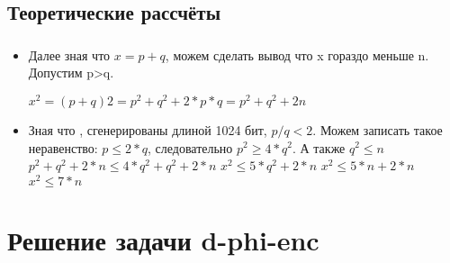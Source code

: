 \documentclass[t]{beamer}
\begin{document}
\subsection{Теоретические рассчёты}
\begin{frame}[t] %
	\frametitle{\insertsection}
	\framesubtitle{\insertsubsection}
        \begin{itemize}
            \item Далее зная что $x = p + q$, можем сделать вывод что x гораздо меньше n. Допустим p>q.
            \begin{center}
                \( x^2=(p+q)2=p^2+q^2+2*p*q=p^2+q^2+2n \)\newline
            \end{center}
            
            \item Зная что ,  сгенерированы длиной 1024 бит, $p/q < 2$. Можем записать такое неравенство:\newline
            $p\leq 2*q$, следовательно $p^2 \geq 4*q^2$. А также $q^2 \leq n$\newline
            $p^2+q^2+2*n \leq 4*q^2+q^2+2*n$\newline
            $x^2 \leq 5*q^2+2*n$\newline
            $x^2 \leq 5*n+2*n$\newline
            $x^2 \leq 7*n$\newline

	\end{itemize}
\end{frame}

\section{Решение задачи d-phi-enc}
\end{document}
